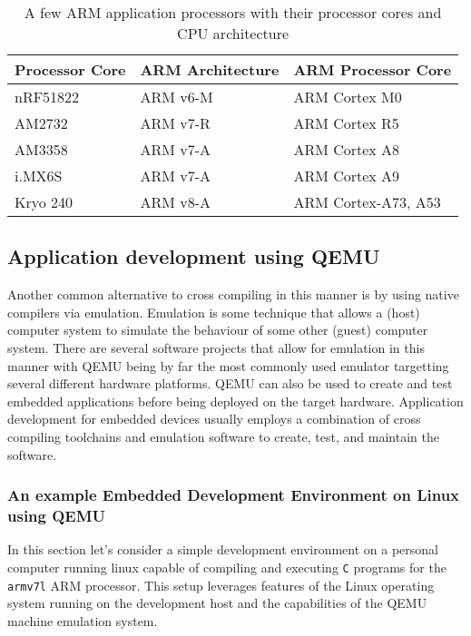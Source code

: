\begin{table}[h]
	\centering
	\begin{tabular}{ |p{7em}|p{9em}|p{12em}| }
		\hline
			\textbf{Processor Core} & \textbf{ARM Architecture} & \textbf{ARM Processor Core} \\
		\hline
			nRF51822 & ARM v6-M & ARM Cortex M0 \\
		\hline
			AM2732 & ARM v7-R & ARM Cortex R5 \\
		\hline
			AM3358 & ARM v7-A & ARM Cortex A8 \\
		\hline
			i.MX6S & ARM v7-A & ARM Cortex A9 \\
		\hline
			Kryo 240 & ARM v8-A & ARM Cortex-A73, A53 \\
		\hline
	\end{tabular}
	\caption{A few ARM application processors with their processor cores and CPU architecture}
	\label{table:arm}
\end{table}

\subsection{Application development using QEMU}

Another common alternative to cross compiling in this manner is by using native compilers via emulation. Emulation is some technique that allows a (host) computer system to simulate the behaviour of some other (guest) computer system. There are several software projects that allow for emulation in this manner with QEMU being by far the most commonly used emulator targetting several different hardware platforms. QEMU can also be used to create and test embedded applications before being deployed on the target hardware. Application development for embedded devices usually employs a combination of cross compiling toolchains and emulation software to create, test, and maintain the software.

\subsubsection{An example Embedded Development Environment on Linux using QEMU}

In this section let's consider a simple development environment on a personal computer running linux capable of compiling and executing \texttt{C} programs for the \texttt{armv7l} ARM processor. This setup leverages features of the Linux operating system running on the development host and the capabilities of the QEMU machine emulation system.

